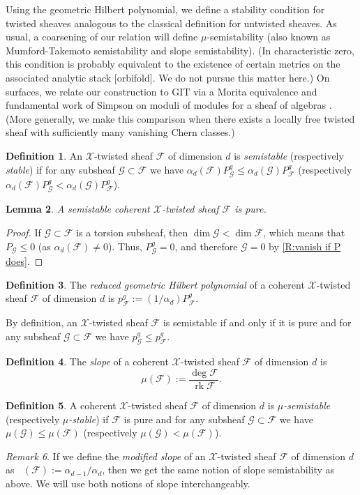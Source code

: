\documentclass[11pt]{amsart}
\newcommand{\ms}[1]{\mathscr #1}
\DeclareMathOperator{\muhat}{\widehat{\mu}}
\renewcommand{\[}{[\!\hspace{0.03em}[}
\renewcommand{\]}{]\!\hspace{0.03em}]}
\renewcommand{\(}{(\!\hspace{0.03em}(}
\renewcommand{\)}{)\!\hspace{0.03em})}
\DeclareMathOperator{\rk}{\operatorname{rk}}
\newtheorem{lem}{Lemma}[subsubsection]%
\theoremstyle{definition}
\newtheorem{defn}[lem]{Definition}
\theoremstyle{remark}
\newtheorem{remark}[lem]{Remark}
\begin{document}
Using the geometric Hilbert polynomial, we define 
a stability condition for twisted sheaves analogous to the classical definition 
for untwisted sheaves.  As usual, a coarsening of our relation will define 
$\mu$-semistability (also known as Mumford-Takemoto semistability and slope semistability).  (In 
characteristic zero, this condition is probably equivalent to the existence of 
certain metrics on the associated analytic stack [orbifold].  We do 
not pursue this matter here.)  On surfaces, we relate our 
construction to GIT via a Morita equivalence and fundamental work of Simpson on 
moduli of modules for a sheaf of algebras \cite{simpson}.  (More generally, we 
make this comparison when there exists a locally free twisted sheaf 
with sufficiently many vanishing Chern classes.)

\begin{defn}\label{D:semistability} An $\ms X$-twisted sheaf $\ms F$ of dimension $d$ is \emph{semistable\/} 
(respectively \emph{stable\/}) if for any subsheaf $\ms G\subset\ms F$ 
we have $\alpha_{d}(\ms F)P^{g}_{\ms G}\leq\alpha_{d}(\ms G)P^{g}_{\ms F}$ 
(respectively $\alpha_{d}(\ms F)P^{g}_{\ms G}<\alpha_{d}(\ms G)P^{g}_{\ms F}$).
\end{defn}
\begin{lem} A semistable coherent $\ms X$-twisted sheaf $\ms F$ is 
pure.
\end{lem}
\begin{proof} If $\ms G\subset\ms F$ is a torsion subsheaf, then 
$\dim\ms G<\dim\ms F$, which means that $P_{\ms G}\leq 0$ (as 
$\alpha_{d}(\ms F)\neq 0$).  Thus, $P^{g}_{\ms G}=0$, and therefore $\ms 
G=0$ by \ref{R:vanish if P does}.
\end{proof}
\begin{defn} The \emph{reduced geometric Hilbert polynomial\/} of a 
coherent $\ms X$-twisted sheaf $\ms F$ of dimension $d$ is $p^{g}_{\ms 
F}:=(1/\alpha_{d})P^{g}_{\ms F}$.
\end{defn}
By definition, an $\ms X$-twisted sheaf $\ms F$ is semistable if and only 
if it is pure and for any subsheaf $\ms G\subset\ms F$ we have 
$p^{g}_{\ms G}\leq p^{g}_{\ms F}$.

\begin{defn} The \emph{slope\/} of a coherent $\ms X$-twisted sheaf 
$\ms F$ of dimension $d$ is 
$$\mu(\ms F):=\frac{\deg\ms F}{\rk\ms F}.$$
\end{defn}

\begin{defn} A coherent $\ms X$-twisted sheaf $\ms F$ of dimension 
$d$ is \emph{$\mu$-semistable\/} (respectively \emph{$\mu$-stable\/}) 
if $\ms F$ is pure and for any subsheaf $\ms G\subset\ms F$ we have 
$\mu(\ms G)\leq\mu(\ms F)$ (respectively $\mu(\ms G)<\mu(\ms F)$).
\end{defn}
\begin{remark} If we define the \emph{modified slope\/} of an $\ms 
X$-twisted sheaf $\ms F$ of dimension $d$ as $\muhat(\ms F):=\alpha_{d-1}/\alpha_{d}$, then 
we get the same notion of slope semistability as above.  We will 
use both notions of slope interchangeably.\end{remark}
\end{document}

